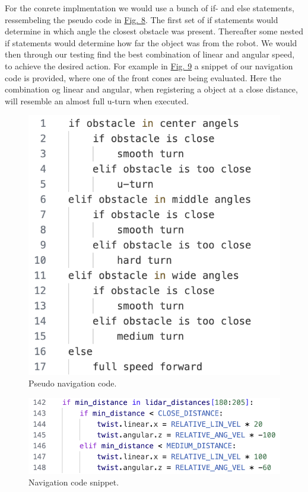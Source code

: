 \documentclass[conference]{IEEEtran}
\begin{document}
For the conrete implmentation we would use a bunch of if- and else statements, ressembeling the pseudo code in \href{sec:pseudo}{Fig. 8}.
The first set of if statements would determine in which angle the closest obstacle was present.
Thereafter some nested if statements would determine how far the object was from the robot.
We would then through our testing find the best combination of linear and angular speed, to achieve the desired action.
For example in \href{sec:navigation}{Fig. 9} a snippet of our navigation code is provided, where one of the front cones are being evaluated. 
Here the combination og linear and angular, when registering a object at a close distance, will resemble an almost full u-turn when executed.
\begin{figure}[htbp]
    \centerline{\includegraphics[width=0.6\columnwidth\hspace{-1.3cm}]{Pictures/Pseudo.png}}
    \caption{Pseudo navigation code.}
    \label{sec:pseudo}
    \end{figure}
\begin{figure}[htbp]
    \centerline{\includegraphics[width=0.9\columnwidth\hspace{-0.1cm}]{Pictures/Navigation.png}}
    \caption{Navigation code snippet.}
    \label{sec:navigation}
    \end{figure}  
\end{document}
